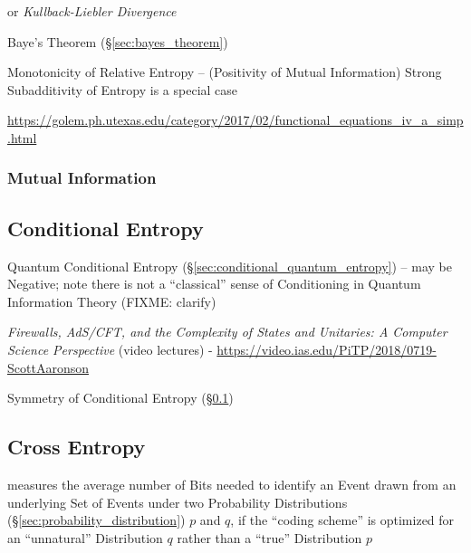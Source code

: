or \emph{Kullback-Liebler Divergence}

\fist Baye's Theorem (\S\ref{sec:bayes_theorem})

Monotonicity of Relative Entropy -- (Positivity of Mutual Information) Strong
Subadditivity of Entropy is a special case

\url{https://golem.ph.utexas.edu/category/2017/02/functional_equations_iv_a_simp.html}



\subsubsection{Mutual Information}\label{sec:mutual_information}



\subsection{Conditional Entropy}\label{sec:conditional_entropy}

\fist Quantum Conditional Entropy (\S\ref{sec:conditional_quantum_entropy}) --
may be Negative; note there is not a ``classical'' sense of Conditioning in
Quantum Information Theory (FIXME: clarify)

\asterism

\emph{Firewalls, AdS/CFT, and the Complexity of States and Unitaries: A Computer
  Science Perspective}
(video lectures)
-
\url{https://video.ias.edu/PiTP/2018/0719-ScottAaronson}

Symmetry of Conditional Entropy (\S\ref{sec:conditional_entropy})



\subsection{Cross Entropy}\label{sec:cross_entropy}

measures the average number of Bits needed to identify an Event drawn from an
underlying Set of Events under two Probability Distributions
(\S\ref{sec:probability_distribution}) $p$ and $q$, if the ``coding scheme'' is
optimized for an ``unnatural'' Distribution $q$ rather than a ``true''
Distribution $p$



